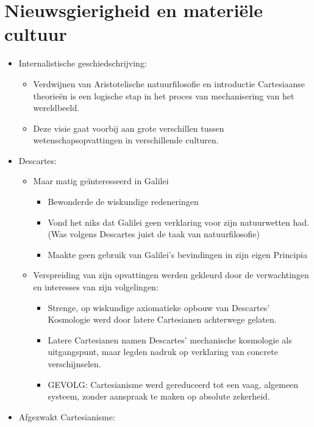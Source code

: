 \documentclass{article}
\begin{document}
  \section{Nieuwsgierigheid en materi\"ele cultuur}
    \begin{itemize}
      \item Internalistische geschiedschrijving:
      \begin{itemize}
        \item Verdwijnen van Aristotelische natuurfilosofie en introductie Cartesiaanse theorie\"en is een logische stap in het proces van mechanisering van het wereldbeeld.
        \item Deze visie gaat voorbij aan grote verschillen tussen wetenschapsopvattingen in verschillende culturen.
      \end{itemize}
      \item Descartes:
      \begin{itemize}
        \item Maar matig ge\"interesseerd in Galilei
        \begin{itemize}
          \item Bewonderde de wiskundige redeneringen
          \item Vond het niks dat Galilei geen verklaring voor zijn natuurwetten had. (Was volgens Descartes juist de taak van natuurfilosofie)
          \item Maakte geen gebruik van Galilei's bevindingen in zijn eigen Principia
        \end{itemize}
        \item Verspreiding van zijn opvattingen werden gekleurd door de verwachtingen en interesses van zijn volgelingen:
        \begin{itemize}
          \item Strenge, op wiskundige axiomatieke opbouw van Descartes' Kosmologie werd door latere Cartesianen achterwege gelaten.
          \item Latere Cartesianen namen Descartes' mechanische kosmologie als uitgangspunt, maar legden nadruk op verklaring van concrete verschijnselen.
          \item GEVOLG: Cartesianisme werd gereduceerd tot een vaag, algemeen systeem, zonder aanspraak te maken op absolute zekerheid.
        \end{itemize}
      \end{itemize}
      \item Afgezwakt Cartesianisme:
      \begin{itemize}

\end{itemize}
\end{itemize}
\end{document}
